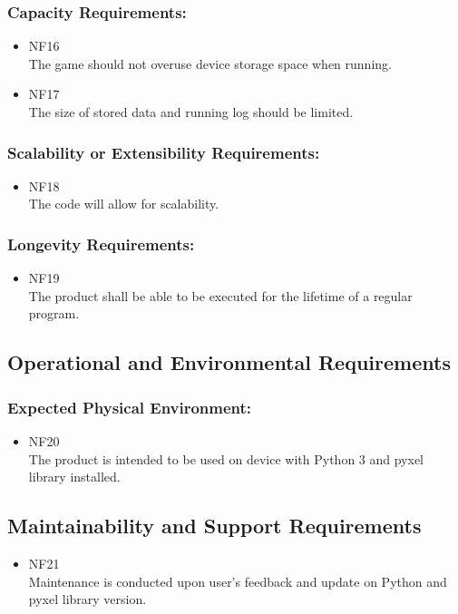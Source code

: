 \documentclass[12pt, titlepage]{article}
\begin{document}
\subsubsection{Capacity Requirements:}	
\begin{itemize}
    \item NF{\color{red}16}\\
    The game should not overuse device storage space when running.
    \item NF{\color{red}17}\\
    The size of stored data and running log should be limited.
\end{itemize}
\subsubsection{Scalability or Extensibility Requirements:}
\begin{itemize}
    \item NF{\color{red}18}\\
    The code will allow for scalability.
\end{itemize}
\subsubsection{Longevity Requirements:}
\begin{itemize}
    \item NF{\color{red}19}\\
    The product shall be able to be executed for the lifetime of a regular program. 
\end{itemize}
\subsection{Operational and Environmental Requirements}
\subsubsection{Expected Physical Environment:}
\begin{itemize}
    \item NF{\color{red}20}\\
    The product is intended to be used on device {\color{red} with Python 3 and pyxel library installed}.
\end{itemize}
\subsection{Maintainability and Support Requirements}
\begin{itemize}
    \item NF{\color{red}21}\\
    Maintenance is conducted upon user's feedback and update on {\color{red}Python and pyxel library version}.
\end{itemize}
\end{document}
